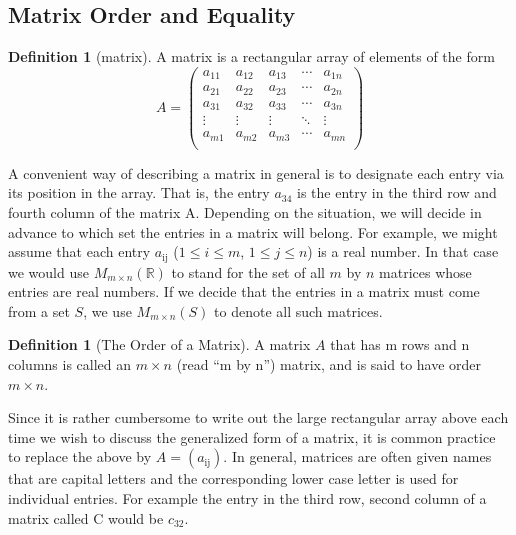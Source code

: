 \documentclass[10pt,]{book}
\theoremstyle{plain}
\theoremstyle{definition}
\newtheorem{definition}[theorem]{Definition}
\theoremstyle{definition}
\theoremstyle{definition}
\theoremstyle{definition}
\begin{document}
\subsection[Matrix Order and Equality]{Matrix Order and Equality}\label{ss-order-equality}
\begin{definition}[matrix]\label{def-matrix}
A matrix is a rectangular array of elements of the form 
\begin{equation*}A = \left(
\begin{array}{ccccc}
 a_{11} & a_{12} & a_{13} & \cdots  & a_{1n} \\
 a_{21} & a_{22} & a_{23} & \cdots  & a_{2n} \\
 a_{31} & a_{32} & a_{33} & \cdots  & a_{3n} \\
 \vdots  & \vdots  & \vdots  & \ddots & \vdots  \\
 a_{m1} & a_{m2} & a_{m3} & \cdots  & a_{mn} \\
\end{array} \right)\end{equation*}
%
\end{definition}
A convenient way of describing a matrix in general is to designate each entry via its position in the array. That is, the entry \(a_{34}\) is the entry in the third row and fourth column of the matrix A. Depending on the situation, we will decide in advance to which set the entries in a matrix will belong. For example, we might assume that each entry \(a_{\text{ij}}\) (\(1 \leq i\leq  m\), \(1 \leq  j \leq  n\)) is a real number. In
that case we would use \(M_{m\times n}(\mathbb{R})\) to stand for the set of all \(m\) by \(n\) matrices whose entries are real numbers. If we decide that the entries in a matrix must come from a set \(S\), we use \(M_{m\times n}(S)\) to denote all such matrices.%
\begin{definition}[The Order of a Matrix]\label{def-matrix-order}
A matrix \(A\) that has m rows and n columns is called an \(m\times n\) (read ``m by n'') matrix, and is said to have order \(m \times  n\).%
\end{definition}
\par
Since it is rather cumbersome to write out the large rectangular array above each time we wish to discuss the generalized form of a matrix, it is common practice to replace the above by \(A = \left(a_{\text{ij}}\right)\). In general, matrices are often given names that are capital letters and the corresponding lower case letter is used for individual entries. For example the entry in the third row, second column of a matrix called C would be \(c_{32}\).%
\end{document}
